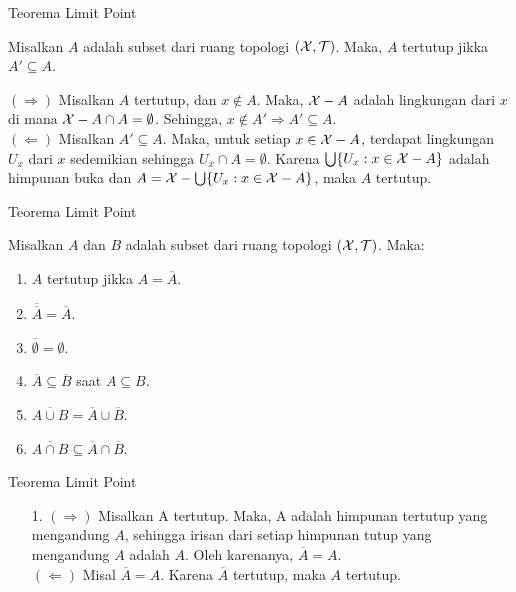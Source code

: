 \begin{frame}{Teorema Limit Point}
\begin{tcolorbox}[enhanced,title=Teorema 1.21, frame style tile={width=\paperwidth}{\wallpaper}]
Misalkan $A$ adalah subset dari ruang topologi $(\mathcal{X},\mathcal{T})$. Maka, $A$ tertutup jikka $A'\subseteq A$.
\end{tcolorbox}

\begin{tcolorbox}[enhanced,title=Teorema 1.21 (Bukti), frame style tile={width=\paperwidth}{\wallpaper}]
$(\Rightarrow)$ Misalkan $A$ tertutup, dan $x\notin A$. Maka, $\mathcal{X}-A$ adalah lingkungan dari $x$ di mana $\mathcal{X}-A\cap A = \emptyset$. Sehingga, $x\notin A'\Rightarrow A'\subseteq A$.\\
$(\Leftarrow)$ Misalkan $A'\subseteq A$. Maka, untuk setiap $x\in \mathcal{X}-A$, terdapat lingkungan $U_x$ dari $x$ sedemikian sehingga $U_x\cap A = \emptyset$. Karena $\bigcup\{U_x:x\in\mathcal{X} - A\}$ adalah himpunan buka dan $A = \mathcal{X} - \bigcup\{U_x:x\in \mathcal{X} - A\}$, maka $A$ tertutup.
\end{tcolorbox}
    
\end{frame}

\begin{frame}{Teorema Limit Point}
\begin{tcolorbox}[enhanced,title=Teorema 1.22, frame style tile={width=\paperwidth}{\wallpaper}]
Misalkan $A$ dan $B$ adalah subset dari ruang topologi $(\mathcal{X}, \mathcal{T})$. Maka:
\begin{enumerate}
    \item $A$ tertutup jikka $A = \overline{A}$.
    \item $\overline{\overline{A}} = \overline{A}$.
    \item $\overline{\emptyset} = \emptyset$.
    \item $\overline{A}\subseteq \overline{B}$ saat $A\subseteq B$.
    \item $\overline{A\cup B} = \overline{A} \cup \overline{B}$.
    \item $\overline{A\cap B} \subseteq \overline{A} \cap \overline{B}$.
\end{enumerate}
\end{tcolorbox}
\end{frame}

\begin{frame}{Teorema Limit Point}
    \begin{tcolorbox}[enhanced,title=Teorema 1.22 (Bukti), frame style tile={width=\paperwidth}{\wallpaper}]
    \begin{enumerate}
        \item[1.] $(\Rightarrow)$ Misalkan A tertutup. Maka, A adalah himpunan tertutup yang mengandung $A$, sehingga irisan dari setiap himpunan tutup yang mengandung $A$ adalah $A$. Oleh karenanya, $\overline{A} = A$.\\
        $(\Leftarrow)$ Misal $\overline{A} = A$. Karena $\overline{A}$ tertutup, maka $A$ tertutup. 
    \end{enumerate}
    \end{tcolorbox}
\end{frame}

